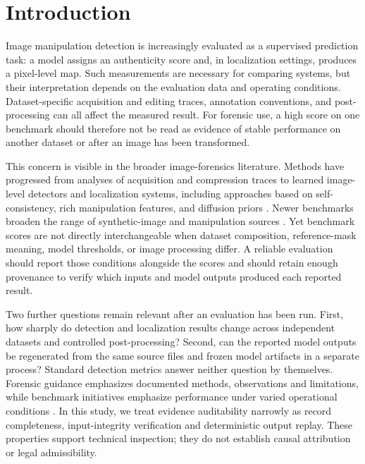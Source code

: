\section{Introduction}

Image manipulation detection is increasingly evaluated as a supervised prediction task: a model assigns an authenticity score and, in localization settings, produces a pixel-level map. Such measurements are necessary for comparing systems, but their interpretation depends on the evaluation data and operating conditions. Dataset-specific acquisition and editing traces, annotation conventions, and post-processing can all affect the measured result. For forensic use, a high score on one benchmark should therefore not be read as evidence of stable performance on another dataset or after an image has been transformed.

This concern is visible in the broader image-forensics literature. Methods have progressed from analyses of acquisition and compression traces to learned image-level detectors and localization systems, including approaches based on self-consistency, rich manipulation features, and diffusion priors \cite{farid2009imageforgery,verdoliva2020mediaforensics,huh2018fighting,zhou2018rich,wu2019mantra,yu2024diffforensics}. Newer benchmarks broaden the range of synthetic-image and manipulation sources \cite{ojha2023universal,yan2024df40,zhu2023genimage,du2025forensichub}. Yet benchmark scores are not directly interchangeable when dataset composition, reference-mask meaning, model thresholds, or image processing differ. A reliable evaluation should report those conditions alongside the scores and should retain enough provenance to verify which inputs and model outputs produced each reported result.

Two further questions remain relevant after an evaluation has been run. First, how sharply do detection and localization results change across independent datasets and controlled post-processing? Second, can the reported model outputs be regenerated from the same source files and frozen model artifacts in a separate process? Standard detection metrics answer neither question by themselves. Forensic guidance emphasizes documented methods, observations and limitations, while benchmark initiatives emphasize performance under varied operational conditions \cite{swgde2025imageauth,nist2025guardians,nistopenmfc}. In this study, we treat evidence auditability narrowly as record completeness, input-integrity verification and deterministic output replay. These properties support technical inspection; they do not establish causal attribution or legal admissibility.

